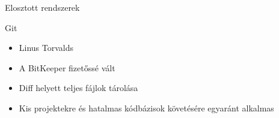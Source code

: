 
\begin{frame}{Elosztott rendszerek}
    \pause
    \begin{block}{Git}
        \begin{itemize}
            \pause \item Linus Torvalds
            \pause \item A BitKeeper fizetőssé vált
            \pause \item Diff helyett teljes fájlok tárolása
            \pause \item Kis projektekre és hatalmas kódbázisok követésére egyaránt alkalmas
        \end{itemize}
    \end{block}
\end{frame}


